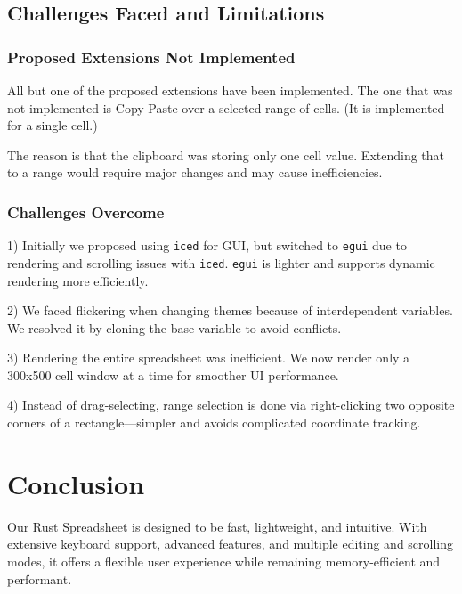 \documentclass{article}
\begin{document}
\subsection{Challenges Faced and Limitations}
\label{sec:challenges}

\subsubsection{Proposed Extensions Not Implemented}
\label{sec:limitations_unimplemented}

All but one of the proposed extensions have been implemented. The one that was not implemented is Copy-Paste over a selected range of cells. (It is implemented for a single cell.)

The reason is that the clipboard was storing only one cell value. Extending that to a range would require major changes and may cause inefficiencies.

\subsubsection{Challenges Overcome}
\label{sec:limitations_overcome}
1) Initially we proposed using \texttt{iced} for GUI, but switched to \texttt{egui} due to rendering and scrolling issues with \texttt{iced}. \texttt{egui} is lighter and supports dynamic rendering more efficiently.

2) We faced flickering when changing themes because of interdependent variables. We resolved it by cloning the base variable to avoid conflicts.

3) Rendering the entire spreadsheet was inefficient. We now render only a 300x500 cell window at a time for smoother UI performance.

4) Instead of drag-selecting, range selection is done via right-clicking two opposite corners of a rectangle—simpler and avoids complicated coordinate tracking.

\section{Conclusion}
Our Rust Spreadsheet is designed to be fast, lightweight, and intuitive. With extensive keyboard support, advanced features, and multiple editing and scrolling modes, it offers a flexible user experience while remaining memory-efficient and performant.

\appendix
\end{document}
